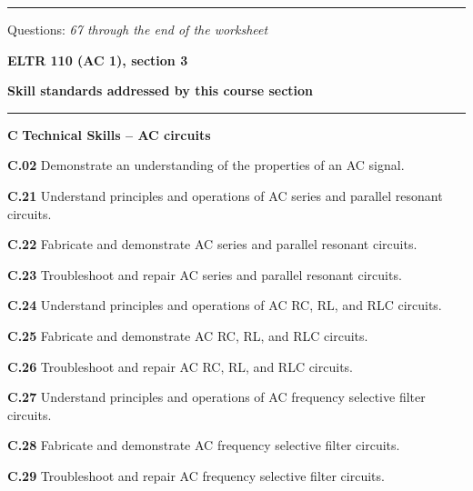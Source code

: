 \vskip 10pt
\hrule \vskip 5pt
\noindent
{}

\hskip 10pt Questions: {\it 67 through the end of the worksheet}
 
\vskip 10pt








\vfil \eject

\centerline{\bf ELTR 110 (AC 1), section 3} \bigskip 
 
\vskip 10pt

\noindent
{\bf Skill standards addressed by this course section}

\vskip 5pt

\hrule \vskip 10pt
\noindent
{}

\vskip 5pt

\medskip
\item{\bf C} {\bf Technical Skills -- AC circuits}
\item{\bf C.02} Demonstrate an understanding of the properties of an AC signal.
\item{\bf C.21} Understand principles and operations of AC series and parallel resonant circuits.
\item{\bf C.22} Fabricate and demonstrate AC series and parallel resonant circuits.
\item{\bf C.23} Troubleshoot and repair AC series and parallel resonant circuits.
\item{\bf C.24} Understand principles and operations of AC RC, RL, and RLC circuits.
\item{\bf C.25} Fabricate and demonstrate AC RC, RL, and RLC circuits.
\item{\bf C.26} Troubleshoot and repair AC RC, RL, and RLC circuits.
\item{\bf C.27} Understand principles and operations of AC frequency selective filter circuits.
\item{\bf C.28} Fabricate and demonstrate AC frequency selective filter circuits.
\item{\bf C.29} Troubleshoot and repair AC frequency selective filter circuits.
\medskip

\vskip 5pt

